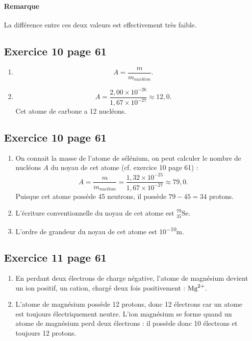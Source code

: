 \documentclass[12pt,a4paper]{article}
\begin{document}
\paragraph{Remarque} La différence entre ces deux valeurs est effectivement très faible.

\subsection*{Exercice 10 page 61}

\begin{enumerate}
\item 
\[
A = \frac{m}{m_{nucléon}}.
\]
\item 
\[
A = \frac{2{,}00\times 10^{-26}}{1{,}67\times 10^{-27}} \approx 12{,}0.
\]
Cet atome de carbone a 12 nucléons.
\end{enumerate}

\subsection*{Exercice 10 page 61}

\begin{enumerate}
\item On connait la masse de l'atome de sélénium, on peut calculer le nombre de nucléons $A$ du noyau de cet atome (cf. exercice 10 page 61) :
\[
A = \frac{m}{m_{nucléon}} =  \frac{1{,}32\times 10^{-25}}{1{,}67\times 10^{-27}} \approx 79{,}0.
\]
Puisque cet atome possède 45 neutrons, il possède $79-45 = 34$ protons.
\item L'écriture conventionnelle du noyau de cet atome est $ ^{79}_{35}\text{Se} $.
\item L'ordre de grandeur du noyau de cet atome est \unit{10^{-10}}{m}.
\end{enumerate}

\subsection*{Exercice 11 page 61}

\begin{enumerate}
\item En perdant deux électrons de charge négative, l'atome de magnésium devient un ion positif, un cation, chargé deux fois positivement : $\text{Mg}^\text{2+}$.

\item L'atome de magnésium possède 12 protons, donc 12 électrons car un atome est toujours électriquement neutre.
L'ion magnésium se forme quand un atome de magnésium perd deux électrons : il possède donc 10 électrons et toujours 12 protons.
\end{enumerate}
\end{document}
